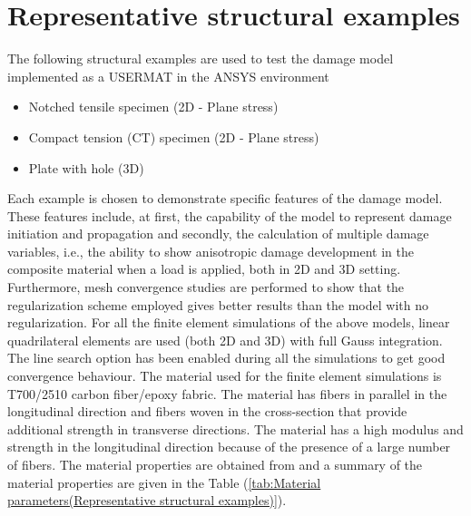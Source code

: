 \documentclass[12pt,twoside]{report}
\begin{document}
\section{Representative structural examples}
\indent\indent\indent The following structural examples are used to test the damage model implemented as a USERMAT in the ANSYS environment
\begin{itemize}
\item Notched tensile specimen (2D - Plane stress)
\item Compact tension (CT) specimen (2D - Plane stress)
\item Plate with hole (3D)
\end{itemize}
Each example is chosen to demonstrate specific features of the damage model. These features include, at first, the capability of the model to represent damage initiation and propagation and secondly, the calculation of multiple damage variables, i.e., the ability to show anisotropic damage development in the composite material when a load is applied, both in 2D and 3D setting. Furthermore, mesh convergence studies are performed to show that the regularization scheme employed gives better results than the model with no regularization. For all the finite element simulations of the above models, linear quadrilateral elements are used (both 2D and 3D) with full Gauss integration. The line search option has been enabled during all the simulations to get good convergence behaviour. The material used for the finite element simulations is T700/2510 carbon fiber/epoxy fabric. The material has fibers in parallel in the longitudinal direction and fibers woven in the cross-section that provide additional strength in transverse directions. The material has a high modulus and strength in the longitudinal direction because of the presence of a large number of fibers. The material properties are obtained from  and a summary of the material properties are given in the Table (\ref{tab:Material parameters(Representative structural examples)}). \\
\end{document}
